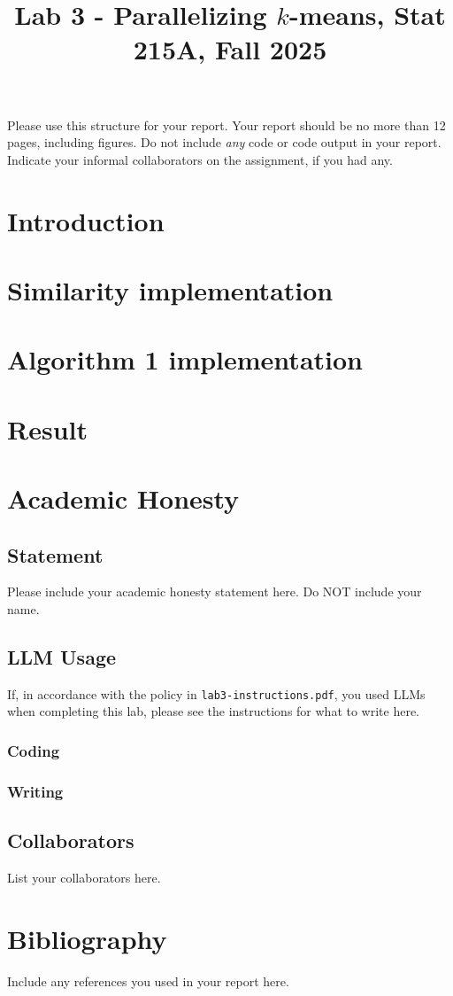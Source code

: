 \documentclass[10pt,letterpaper]{article}
\title{Lab 3 - Parallelizing $k$-means, Stat 215A, Fall 2025\vspace{-2em}}
\begin{document}
\maketitle

Please use this structure for your report. Your report should be no more than 12 pages, including figures. Do not include \emph{any} code or code output in your report. Indicate your informal collaborators on the assignment, if you had any.

\section{Introduction}\label{introduction}

\section{Similarity implementation}

\section{Algorithm 1 implementation}

\section{Result}

\section{Academic Honesty}

\subsection{Statement}
Please include your academic honesty statement here. Do NOT include your name.

\subsection{LLM Usage}
If, in accordance with the policy in \texttt{lab3-instructions.pdf}, you used LLMs when completing this lab, please see the instructions for what to write here.

\subsubsection*{Coding}

\subsubsection*{Writing}

\subsection{Collaborators}
List your collaborators here.
\section{Bibliography}
Include any references you used in your report here.
\end{document}
